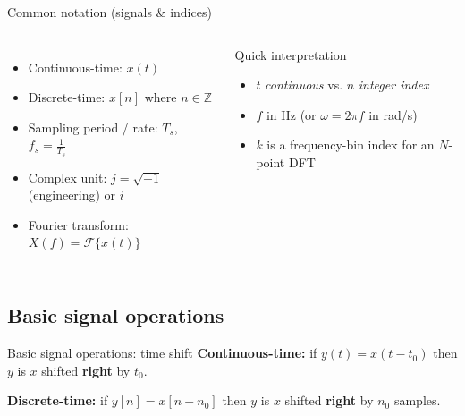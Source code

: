 \documentclass[aspectratio=169]{beamer}
\begin{document}
\begin{frame}{Common notation (signals \& indices)}
\small
\begin{columns}[T,onlytextwidth]
\begin{itemize}
  \item Continuous-time: $x(t)$
  \item Discrete-time: $x[n]$ where $n\in\mathbb{Z}$
  \item Sampling period / rate: $T_s$, $f_s=\tfrac{1}{T_s}$
  \item Complex unit: $j=\sqrt{-1}$ (engineering) or $i$
  \item Fourier transform: $X(f)=\mathcal{F}\{x(t)\}$

\end{itemize}
\begin{block}{Quick interpretation}
\begin{itemize}
  \item $t$ \textit{continuous} vs. $n$ \textit{integer index}
  \item $f$ in Hz (or $\omega=2\pi f$ in rad/s)
  \item $k$ is a frequency-bin index for an $N$-point DFT
\end{itemize}
\end{block}
\end{columns}
\end{frame}




\subsection{Basic signal operations}

\begin{frame}{Basic signal operations: time shift}
\small
\textbf{Continuous-time:} if $y(t)=x(t-t_0)$ then $y$ is $x$ shifted \textbf{right} by $t_0$.

\vspace{0.5em}
\textbf{Discrete-time:} if $y[n]=x[n-n_0]$ then $y$ is $x$ shifted \textbf{right} by $n_0$ samples.

\vspace{0.5em}
\centering
{}


\end{frame}
\end{document}
